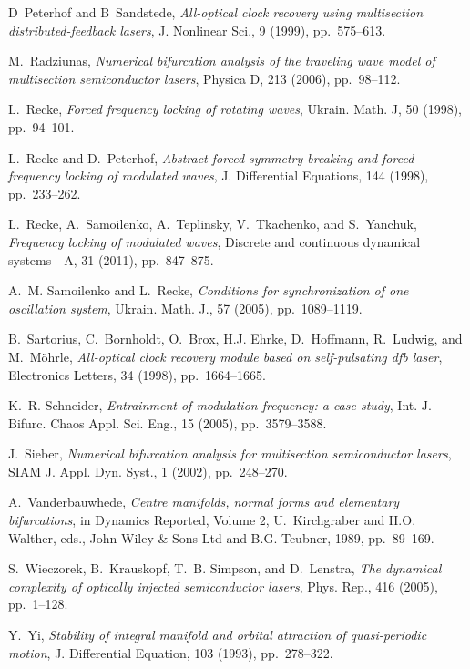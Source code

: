 \begin{description}
\begin{thebibliography}{10}
{\sc D~Peterhof and B~Sandstede}, {\em All-optical clock recovery using
  multisection distributed-feedback lasers}, J. Nonlinear Sci., 9 (1999),
  pp.~575--613.

{\sc M.~Radziunas}, {\em Numerical bifurcation analysis of the traveling wave
  model of multisection semiconductor lasers}, Physica D, 213 (2006),
  pp.~98--112.

{\sc L.~Recke}, {\em Forced frequency locking of rotating waves}, Ukrain. Math.
  J, 50 (1998), pp.~94--101.

{\sc L.~Recke and D.~Peterhof}, {\em Abstract forced symmetry breaking and
  forced frequency locking of modulated waves}, J. Differential Equations, 144
  (1998), pp.~233--262.

{\sc L.~Recke, A.~Samoilenko, A.~Teplinsky, V.~Tkachenko, and S.~Yanchuk}, {\em
  Frequency locking of modulated waves}, Discrete and continuous dynamical
  systems - A, 31 (2011), pp.~847--875.

{\sc A.~M. Samoilenko and L.~Recke}, {\em Conditions for synchronization of one
  oscillation system}, Ukrain. Math. J., 57 (2005), pp.~1089--1119.

{\sc B.~Sartorius, C.~Bornholdt, O.~Brox, H.J. Ehrke, D.~Hoffmann, R.~Ludwig,
  and M.~M{\"o}hrle}, {\em All-optical clock recovery module based on
  self-pulsating dfb laser}, Electronics Letters, 34 (1998), pp.~1664--1665.

{\sc K.~R. Schneider}, {\em Entrainment of modulation frequency: a case study},
  Int. J. Bifurc. Chaos Appl. Sci. Eng., 15 (2005), pp.~3579--3588.

{\sc J.~Sieber}, {\em Numerical bifurcation analysis for multisection
  semiconductor lasers}, SIAM J. Appl. Dyn. Syst., 1 (2002), pp.~248--270.

{\sc A.~Vanderbauwhede}, {\em Centre manifolds, normal forms and elementary
  bifurcations}, in Dynamics Reported, Volume 2, U.~Kirchgraber and H.O.
  Walther, eds., John Wiley \& Sons Ltd and B.G. Teubner, 1989, pp.~89--169.

{\sc S.~Wieczorek, B.~Krauskopf, T.~B. Simpson, and D.~Lenstra}, {\em The
  dynamical complexity of optically injected semiconductor lasers}, Phys. Rep.,
  416 (2005), pp.~1--128.

{\sc Y.~Yi}, {\em Stability of integral manifold and orbital attraction of
  quasi-periodic motion}, J. Differential Equation, 103 (1993), pp.~278--322.
\end{thebibliography}


\end{description}

\renewcommand{\ssp}{a}
